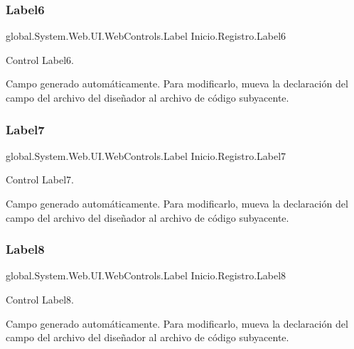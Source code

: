 \subsubsection{\texorpdfstring{Label6}{Label6}}
{\footnotesize\ttfamily global.\+System.\+Web.\+U\+I.\+Web\+Controls.\+Label Inicio.\+Registro.\+Label6\hspace{0.3cm}{\ttfamily [protected]}}



Control Label6. 

Campo generado automáticamente. Para modificarlo, mueva la declaración del campo del archivo del diseñador al archivo de código subyacente. \mbox{\label{classInicio_1_1Registro_a1f3fd3c1774cb311690a4246ba5aca66}} 
\subsubsection{\texorpdfstring{Label7}{Label7}}
{\footnotesize\ttfamily global.\+System.\+Web.\+U\+I.\+Web\+Controls.\+Label Inicio.\+Registro.\+Label7\hspace{0.3cm}{\ttfamily [protected]}}



Control Label7. 

Campo generado automáticamente. Para modificarlo, mueva la declaración del campo del archivo del diseñador al archivo de código subyacente. \mbox{\label{classInicio_1_1Registro_a8f64d7bc53c3f17751f32a57cef78ddb}} 
\subsubsection{\texorpdfstring{Label8}{Label8}}
{\footnotesize\ttfamily global.\+System.\+Web.\+U\+I.\+Web\+Controls.\+Label Inicio.\+Registro.\+Label8\hspace{0.3cm}{\ttfamily [protected]}}



Control Label8. 

Campo generado automáticamente. Para modificarlo, mueva la declaración del campo del archivo del diseñador al archivo de código subyacente. \mbox{\label{classInicio_1_1Registro_a6a93f0b66e0c307a8f53722f3f41ce91}} 
